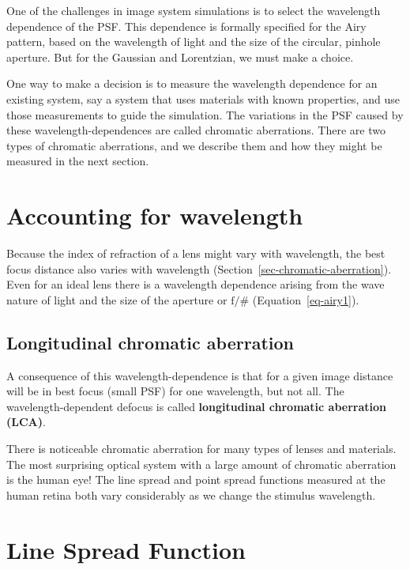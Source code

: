 \documentclass[
  letterpaper,
]{book}
\begin{document}
One of the challenges in image system simulations is to select the
wavelength dependence of the PSF. This dependence is formally specified
for the Airy pattern, based on the wavelength of light and the size of
the circular, pinhole aperture. But for the Gaussian and Lorentzian, we
must make a choice.

One way to make a decision is to measure the wavelength dependence for
an existing system, say a system that uses materials with known
properties, and use those measurements to guide the simulation. The
variations in the PSF caused by these wavelength-dependences are called
chromatic aberrations. There are two types of chromatic aberrations, and
we describe them and how they might be measured in the next section.

\section{Accounting for
wavelength}\label{sec-transverse-chromatic-aberration}

Because the index of refraction of a lens might vary with wavelength,
the best focus distance also varies with wavelength
(Section~\ref{sec-chromatic-aberration}). Even for an ideal lens there
is a wavelength dependence arising from the wave nature of light and the
size of the aperture or \(\text{f}/\#\) (Equation~\ref{eq-airy1}).

\subsection{Longitudinal chromatic
aberration}\label{longitudinal-chromatic-aberration}

A consequence of this wavelength-dependence is that for a given image
distance will be in best focus (small PSF) for one wavelength, but not
all. The wavelength-dependent defocus is called \textbf{longitudinal
chromatic aberration (LCA)}.

There is noticeable chromatic aberration for many types of lenses and
materials. The most surprising optical system with a large amount of
chromatic aberration is the human eye! The line spread and point spread
functions measured at the human retina both vary considerably as we
change the stimulus wavelength.

\section{Line Spread Function}
\end{document}
